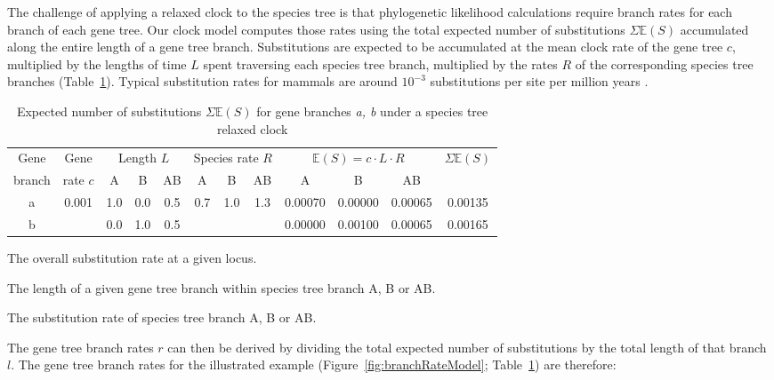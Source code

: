 \documentclass[nogrid]{MBE}%
\begin{document}
The challenge of applying a relaxed clock to the species tree is that
phylogenetic likelihood calculations require branch rates for each branch of
each gene tree. Our clock model computes those rates using the total expected
number of substitutions $\Sigma \mathbb{E}(S)$ accumulated along the entire
length of a gene tree branch. Substitutions are expected to be accumulated at
the mean clock rate of the gene tree $c$, multiplied by the lengths of time
$L$ spent traversing each species tree branch, multiplied by the rates $R$ of
the corresponding species tree branches (Table~\ref{tab:branchRateModel}).
Typical substitution rates for mammals are around $10^{-3}$ substitutions per
site per million years \citep{Phillips06102009}.

\begin{table}[htb!]
\caption{Expected number of substitutions $\Sigma \mathbb{E}(S)$ for gene branches \textit{a, b} under a species tree relaxed clock}
\label{tab:branchRateModel}
\begin{threeparttable}
\begin{tabular*}{\textwidth}{@{\extracolsep{\fill}}cccccccccccc@{}}
\hline
Gene & Gene & \multicolumn{3}{c}{Length\tnote{2} $L$} & \multicolumn{3}{c}{Species rate\tnote{3} $R$} & \multicolumn{3}{c}{$\mathbb{E}(S) = c\cdot L\cdot R$} & \multirow{2}{*}{$\Sigma \mathbb{E}(S)$}\tabularnewline
branch & rate\tnote{1} $c$ & A & B & AB & A & B & AB & A & B & AB & \tabularnewline
\hline
a & \multirow{2}{*}{0.001} & 1.0 & 0.0 & 0.5 & \multirow{2}{*}{0.7} & \multirow{2}{*}{1.0} & \multirow{2}{*}{1.3} & 0.00070 & 0.00000 & 0.00065 & 0.00135\tabularnewline
b & & 0.0 & 1.0 & 0.5 & & & & 0.00000 & 0.00100 & 0.00065 & 0.00165\tabularnewline
\hline
\end{tabular*}
\begin{tablenotes}
\item[1] The overall substitution rate at a given locus.
\item[2] The length of a given gene tree branch within species tree branch A, B or AB.
\item[3] The substitution rate of species tree branch A, B or AB.
\end{tablenotes}
\end{threeparttable}
\end{table}

The gene tree branch rates $r$ can then be derived by dividing the total
expected number of substitutions by the total length of that branch $l$. The
gene tree branch rates for the illustrated example
(Figure~\ref{fig:branchRateModel}; Table~\ref{tab:branchRateModel}) are
therefore:
\end{document}
